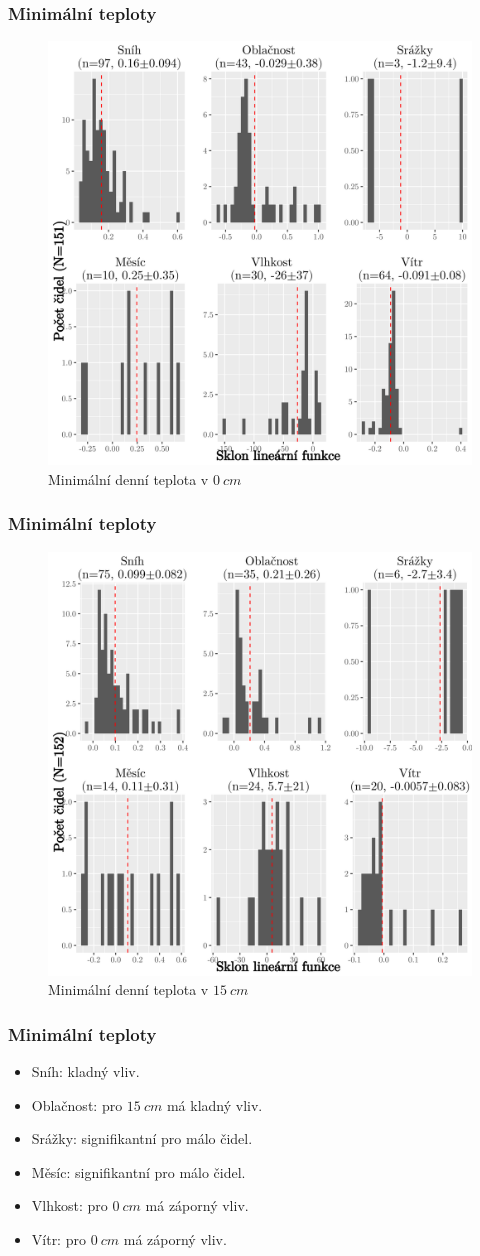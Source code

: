 \documentclass[
	11pt, %
]{beamer}
\begin{document}
\begin{frame}
	\frametitle{Minimální teploty}
	\begin{figure}
		\includegraphics[width=0.8\linewidth,height=0.6\textwidth]{all151minTall0cm_BWyes.png}
		\caption{Minimální denní teplota v $\SI{0}{cm}$}
	\end{figure}
\end{frame}

\begin{frame}
	\frametitle{Minimální teploty}
	\begin{figure}
		\includegraphics[width=0.8\linewidth,height=0.6\textwidth]{all152minTall15cm_BWyes.png}
		\caption{Minimální denní teplota v $\SI{15}{cm}$}
	\end{figure}
\end{frame}

\begin{frame}
	\frametitle{Minimální teploty}
	\begin{itemize}
		\item Sníh: kladný vliv.
		\item Oblačnost: pro $\SI{15}{cm}$ má kladný vliv.
		\item Srážky: signifikantní pro málo čidel.
		\item Měsíc: signifikantní pro málo čidel.
		\item Vlhkost: pro $\SI{0}{cm}$ má záporný vliv.
		\item Vítr: pro $\SI{0}{cm}$ má záporný vliv.
	\end{itemize}
\end{frame}
\end{document}

